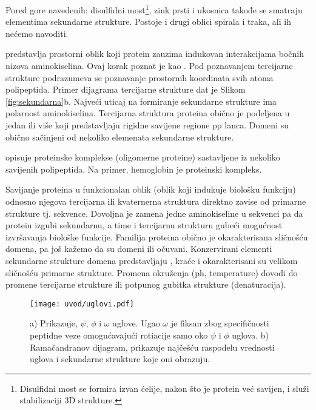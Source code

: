 Pored gore navedenih: disulfidni most\footnote{
  Disulfidni most se formira izvan ćelije, nakon što je protein  već savijen, i
  služi stabilizaciji 3D strukture.
},
zink prsti i ukosnica takođe se smatraju elementima sekundarne strukture.
Postoje i drugi oblici spirala i traka, ali ih nećemo navoditi.




 predstavlja prostorni oblik koji protein zauzima
indukovan interakcijama bočnih nizova aminokiselina. Ovaj korak poznat je kao
 .  Pod poznavanjem tercijarne strukture 
podrazumeva se poznavanje prostornih koordinata svih atoma polipeptida. Primer dijagrama
tercijarne strukture dat je Slikom \ref{fig:sekundarna}b.
Najveći uticaj na formiranje sekundarne strukture ima polarnost aminokiselina.
Tercijarna struktura proteina obično je podeljena u jedan ili više
 koji predstavljaju rigidne savijene regione pp lanca.  Domeni
su obično sačinjeni od nekoliko elemenata sekundarne strukture.

 opisuje proteinske komplekse (oligomerne proteine) sastavljene
iz nekoliko savijenih polipeptida. Na primer, hemoglobin je proteinski kompleks.

Savijanje proteina u funkcionalan oblik (oblik koji indukuje biološku funkciju)
odnosno njegova tercijarna ili kvaternerna struktura direktno zavise od
primarne strukture tj. sekvence. Dovoljna je zamena jedne aminokiseline u sekvenci
pa da protein izgubi sekundarnu, a time i tercijarnu strukturu gubeći mogućnost
izvršavanja biološke funkcije. Familija proteina obično je okarakterisana
sličnošću domena, pa još kažemo da su domeni  ili očuvani.
Konzervirani elementi sekundarne strukture domena predstavljaju
, kraće  i okarakterisani su velikom
sličnošću primarne strukture. Promena okruženja (ph, temperature) dovodi do promene
tercijarne strukture ili potpunog gubitka strukture (denaturacija).


\begin{figure}[th]
\centering
\texttt{[image: uvod/uglovi.pdf]}
\caption {
  \footnotesize
  a) Prikazuje, $\psi$, $\phi$ i $\omega$ uglove. Ugao $\omega$ je fiksan
  zbog specifičnosti peptidne veze omogućavajući rotiacije samo oko
  $\psi$ i $\phi$ uglova.
  b) Ramačandranov dijagram, prikazuje najčešću raspodelu vrednosti uglova
  i sekundarne strukture koje oni obrazuju.
}
\label{fig:uglovi}
\end{figure}


